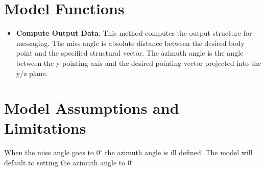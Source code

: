 \section{Model Functions}
\begin{itemize}
	\item \textbf{Compute Output Data}: This method computes the output structure for messaging. The miss angle is absolute distance between the desired body point and the specified structural vector. The azimuth angle is the angle between the y pointing axis and the desired pointing vector projected into the y/z plane.
\end{itemize}

\section{Model Assumptions and Limitations}

When the miss angle goes to 0$^{\circ}$ the azimuth angle is ill defined. The model will default to setting the azimuth angle to 0$^{\circ}$ 